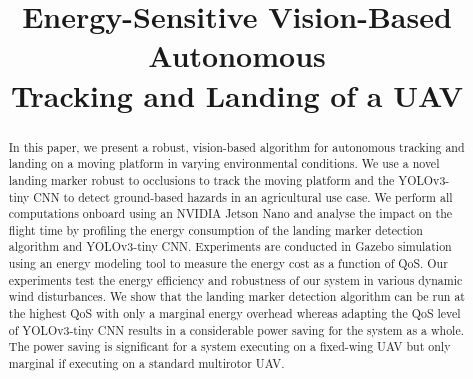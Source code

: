 \documentclass[conference]{IEEEtran}
\begin{document}
\title{Energy-Sensitive Vision-Based Autonomous\\Tracking and Landing of a UAV} 

\author{
}

\maketitle


\begin{abstract}


In this paper, we present a robust, vision-based algorithm for autonomous tracking and landing on a moving platform 
in varying environmental conditions. We use
a novel landing marker robust to occlusions to track the moving
platform and the YOLOv3-tiny CNN to detect ground-based hazards in an agricultural use case. We
perform all computations onboard using an NVIDIA Jetson Nano and analyse the impact on the flight time by profiling the energy consumption of the
landing marker detection algorithm and YOLOv3-tiny CNN. Experiments are conducted in Gazebo simulation using an energy modeling tool to measure the energy cost as a function of QoS. Our experiments test the energy efficiency and robustness of our system in various dynamic wind disturbances. We show that the landing marker detection algorithm can be run at the highest QoS with only a marginal energy overhead whereas adapting the QoS level of YOLOv3-tiny CNN results in a considerable power saving for the system as a whole. The
power saving is significant for a system executing on a fixed-wing UAV but only marginal if executing on a standard multirotor UAV.

\end{abstract}

%
\IEEEpeerreviewmaketitle
\end{document}
